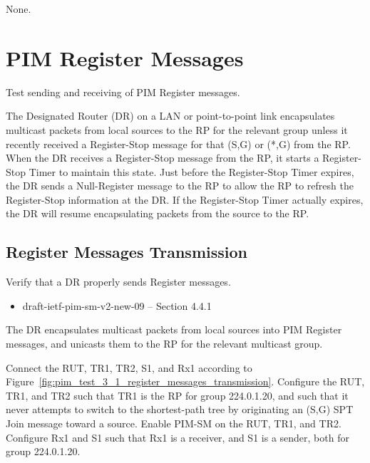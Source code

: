 \documentclass[11pt]{report}
\begin{document}
None.


\chapter{PIM Register Messages}

Test sending and receiving of PIM Register messages.

The Designated Router (DR) on a LAN or point-to-point link encapsulates
multicast packets from local sources to the RP for the relevant group
unless it recently received a Register-Stop message for that (S,G) or
(*,G) from the RP.  When the DR receives a Register-Stop message from
the RP, it starts a Register-Stop Timer to maintain this state.  Just
before the Register-Stop Timer expires, the DR sends a Null-Register
message to the RP to allow the RP to refresh the Register-Stop
information at the DR.  If the Register-Stop Timer actually expires, the
DR will resume encapsulating packets from the source to the RP.

\newpage
\section{Register Messages Transmission}

Verify that a DR properly sends Register messages.

\begin{itemize}
  \item draft-ietf-pim-sm-v2-new-09 -- Section 4.4.1
\end{itemize}

The DR encapsulates multicast packets from local sources into PIM Register
messages, and unicasts them to the RP for the relevant multicast group.

Connect the RUT, TR1, TR2, S1, and Rx1 according to
Figure~\ref{fig:pim_test_3_1_register_messages_transmission}.
Configure the RUT, TR1, and TR2 such that TR1 is the RP for group 224.0.1.20,
and such that it never attempts to switch to the shortest-path tree by
originating an (S,G) SPT Join message toward a source.
Enable PIM-SM on the RUT, TR1, and TR2.
Configure Rx1 and S1 such that Rx1 is a receiver, and S1 is a sender,
both for group 224.0.1.20.
\end{document}
